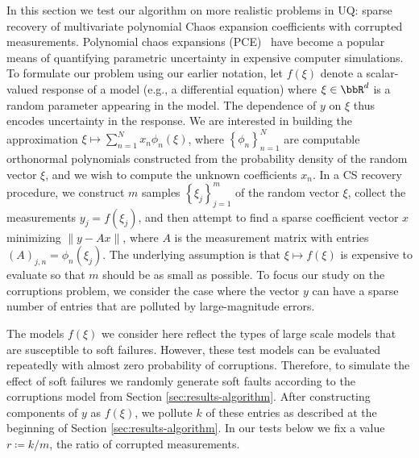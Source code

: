 In this section we test our algorithm on more realistic problems in UQ: sparse recovery of multivariate polynomial Chaos expansion coefficients with corrupted measurements. Polynomial chaos expansions (PCE)~\cite{xiu02,ghanem} have become a popular means of quantifying parametric uncertainty in expensive computer simulations. To formulate our problem using our earlier notation, let $f(\xi)$ denote a scalar-valued response of a model (e.g., a differential equation) where $\xi \in \bbR^d$ is a random parameter appearing in the model. The dependence of $y$ on $\xi$ thus encodes uncertainty in the response. We are interested in building the approximation $\xi \mapsto \sum_{n=1}^N x_n \phi_n(\xi)$, where $\left\{ \phi_n \right\}_{n=1}^N$ are computable orthonormal polynomials constructed from the probability density of the random vector $\xi$, and we wish to compute the unknown coefficients $x_n$. In a CS recovery procedure, we construct $m$ samples $\left\{ \xi_j \right\}_{j=1}^m$ of the random vector $\xi$, collect the measurements $y_j = f(\xi_j)$, and then attempt to find a sparse coefficient vector $x$ minimizing $\| y - A x\|$, where $A$ is the measurement matrix with entries $(A)_{j,n} = \phi_n(\xi_j)$. The underlying assumption is that $\xi \mapsto f(\xi)$ is expensive to evaluate so that $m$ should be as small as possible. To focus our study on the corruptions problem, we consider the case where the vector $y$ can have a sparse number of entries that are polluted by large-magnitude errors.

The models $f(\xi)$ we consider here reflect the types of large scale models that are susceptible to soft failures. However, these test models can be evaluated repeatedly with almost zero probability of corruptions. Therefore, to simulate the effect of soft failures we randomly generate soft faults according to the corruptions model from Section \ref{sec:results-algorithm}. After constructing components of $y$ as $f(\xi)$, we pollute $k$ of these entries as described at the beginning of Section \ref{sec:results-algorithm}. In our tests below we fix a value $r \coloneqq k/m$, the ratio of corrupted measurements. 


